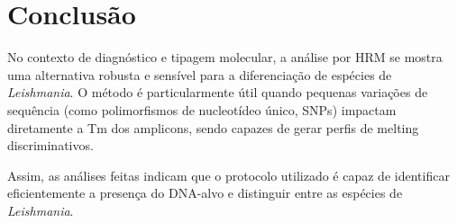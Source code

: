 \section{Conclusão}

No contexto de diagnóstico e tipagem molecular, a análise por HRM se mostra uma
alternativa robusta e sensível para a diferenciação de espécies de
\textit{Leishmania}. O
método é particularmente útil quando pequenas variações de sequência (como
polimorfismos de nucleotídeo único, SNPs) impactam diretamente a Tm dos
amplicons, sendo capazes de gerar perfis de melting 
discriminativos.

Assim, as análises feitas indicam que o protocolo utilizado é capaz de
identificar eficientemente a presença do DNA-alvo e distinguir entre as espécies
de \textit{Leishmania}.  

